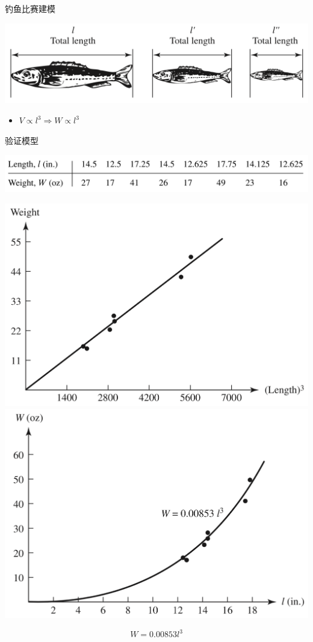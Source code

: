 \documentclass[UTF8, mathserif]{ctexbeamer}
\begin{document}
\begin{frame}{钓鱼比赛建模}
  \begin{center}
    \includegraphics[width=.8\textwidth{}]{fish.png}
  \end{center}

  \begin{itemize}
  \item $V \propto l^3 \Rightarrow W \propto l^3$
  \end{itemize}
\end{frame}

\begin{frame}{验证模型}
  \begin{center}
    \includegraphics[width=.8\textwidth{}]{fishtab.png}
  \end{center}

  \begin{center}
    \includegraphics[width=.4\textwidth{}]{fishlen1.png}
    \includegraphics[width=.4\textwidth{}]{fishlen2.png}
  \end{center}
  \[
  W = 0.00853l^3
  \]
\end{frame}
\end{document}
